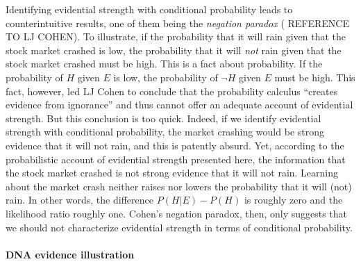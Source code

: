 \documentclass[10pt]{article}
\begin{document}
Identifying 
evidential strength with conditional probability leads to 
counterintuitive results, one of them being the \textit{negation paradox} ( REFERENCE TO LJ COHEN).
To illustrate, if the probability that it will rain given that the stock market crashed 
is low, the probability that it will \textit{not} rain given that the stock market crashed must be high. 
This is a fact about probability. If the probability of $H$ given $E$ is low, the probability of $\neg H$ given $E$ must be high. 
This fact, however, led LJ Cohen to conclude that the probability calculus  
``creates evidence from ignorance'' and thus cannot offer an adequate account of evidential strength. 
But this conclusion is too quick. Indeed, if we identify evidential strength  with conditional probability, the market crashing would be 
strong evidence that it will not rain, and this is patently 
 absurd. Yet, according to the probabilistic account of evidential strength presented here, the information that the stock market crashed 
is not strong evidence that it will not rain. Learning about the market crash neither raises nor lowers the probability that it will (not)
rain. In other words, the difference $P(H|E) - P(H)$ is roughly zero and the likelihood ratio roughly one. 
Cohen's negation paradox, then, only suggests that we should not characterize evidential strength 
in terms of conditional probability. %



\paragraph{DNA evidence illustration}
\end{document}
